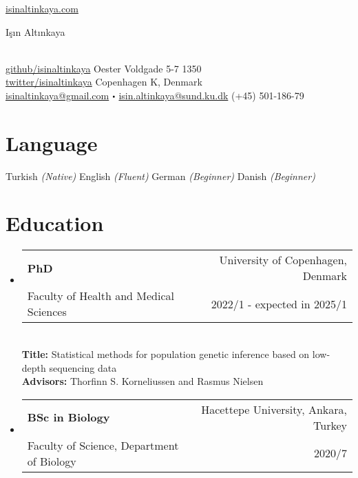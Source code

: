 \documentclass[letterpaper,10.5pt]{article}
\makeatletter
\newcommand\sbullet[1][.5]{\mathbin{\vcenter{\hbox{\scalebox{#1}{$\bullet$}}}}}
\newcommand{\resumeSubheading}[5]{
  \vspace{-1pt}\item
    \begin{tabular*}{0.97\textwidth}{l@{\extracolsep{\fill}}r}
      \textbf{#1} & #2 \\
      {\small#3} & {\small #4} \\
    \end{tabular*}\vspace{3pt} \\
    #5
}
\newcommand{\resumeSubHeadingListStart}{\begin{itemize}[leftmargin=*]}
\newcommand{\resumeSubHeadingListEnd}{\end{itemize}}
\makeatother
\begin{document}

\href{http://isinaltinkaya.com/}{isinaltinkaya.com} \hfill \begin{Huge}I\c{s}{\i}n Alt{\i}nkaya \end{Huge} \\
\href {https://github.com/isinaltinkaya}{github/isinaltinkaya} \hfill Oester Voldgade 5-7 1350 \\
\href {https://twitter.com/isinaltinkaya}{twitter/isinaltinkaya}  \hfill Copenhagen K, Denmark \\
\href{mailto:isinaltinkaya@gmail.com}{isinaltinkaya@gmail.com} $\sbullet[.5]$ \href{mailto:isin.altinkaya@sund.ku.dk}{isin.altinkaya@sund.ku.dk} \hfill (+45) 501-186-79 \\



 
 
\section{Language}
Turkish \textit{(Native)} \hfill English \textit{(Fluent)} \hfill German \textit{(Beginner)} \hfill Danish \textit{(Beginner)} 


\section{Education}
  \resumeSubHeadingListStart
    \resumeSubheading
      {PhD} {University of Copenhagen, Denmark}
      {Faculty of Health and Medical Sciences} {2022/1 - expected in 2025/1}
    \quad \textbf{Title:} Statistical methods for population genetic inference based on low-depth sequencing data \\
    \quad \textbf{Advisors:} Thorfinn S. Korneliussen and Rasmus Nielsen
    \resumeSubheading
      {BSc in Biology} {Hacettepe University, Ankara, Turkey}
      {Faculty of Science, Department of Biology} {2020/7}
  \resumeSubHeadingListEnd
\end{document}
